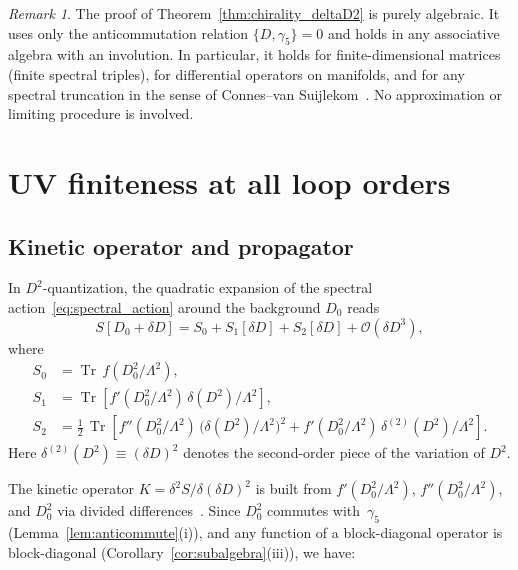 \documentclass[12pt,a4paper]{article}
\theoremstyle{definition}
\theoremstyle{remark}
\newtheorem{remark}[theorem]{Remark}
\newcommand{\Tr}{\operatorname{Tr}}
\newcommand{\half}{\tfrac{1}{2}}
\newcommand{\Lam}{\Lambda}
\newcommand{\order}{\mathcal{O}}
\begin{document}
\begin{remark}
The proof of Theorem~\ref{thm:chirality_deltaD2} is purely algebraic.
It uses only the anticommutation relation $\{D, \gamma_5\} = 0$ and holds in
any associative algebra with an involution.  In particular, it holds for
finite-dimensional matrices (finite spectral triples), for differential
operators on manifolds, and for any spectral truncation in the sense of
Connes--van Suijlekom~\cite{Connes:2020trunc}.  No approximation or limiting
procedure is involved.
\end{remark}

\section{UV finiteness at all loop orders}
\label{sec:uv_finiteness}

\subsection{Kinetic operator and propagator}

In $D^2$-quantization, the quadratic expansion of the spectral
action~\eqref{eq:spectral_action} around the background $D_0$ reads
\begin{equation}\label{eq:S_quadratic}
  S[D_0 + \delta D] = S_0 + S_1[\delta D] + S_2[\delta D] + \order(\delta D^3),
\end{equation}
where
\begin{align}
  S_0 &= \Tr\,f(D_0^2/\Lam^2), \label{eq:S0}\\
  S_1 &= \Tr\!\left[f'(D_0^2/\Lam^2)\,\delta(D^2)/\Lam^2\right], \label{eq:S1}\\
  S_2 &= \half\,\Tr\!\left[f''(D_0^2/\Lam^2)\,\bigl(\delta(D^2)/\Lam^2\bigr)^2
         + f'(D_0^2/\Lam^2)\,\delta^{(2)}(D^2)/\Lam^2\right]. \label{eq:S2}
\end{align}
Here $\delta^{(2)}(D^2) \equiv (\delta D)^2$ denotes the second-order piece
of the variation of $D^2$.

The kinetic operator $K = \delta^2 S / \delta(\delta D)^2$ is built from
$f'(D_0^2/\Lam^2)$, $f''(D_0^2/\Lam^2)$, and $D_0^2$ via divided
differences~\cite{vanNuland:2021oneloop}.  Since $D_0^2$ commutes
with~$\gamma_5$ (Lemma~\ref{lem:anticommute}(i)), and any function of a
block-diagonal operator is block-diagonal (Corollary~\ref{cor:subalgebra}(iii)),
we have:
\end{document}
